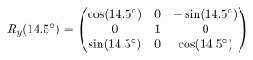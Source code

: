 \documentclass[preview]{standalone}
\begin{document}
\begin{align*}
\special{dvisvgm:raw <g id='unique000'>}R_y(14.5^\circ) = \begin{pmatrix} \cos(14.5^\circ) & 0 & -\sin(14.5^\circ) \\ 0 & 1 & 0 \\ \sin(14.5^\circ) & 0 & \cos(14.5^\circ) \end{pmatrix}\special{dvisvgm:raw </g>}
\end{align*}
\end{document}
